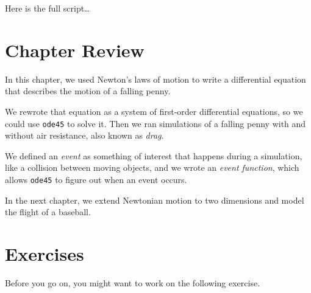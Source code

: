 Here is the full script\dots


\section{Chapter Review}

In this chapter, we used Newton's laws of motion to write a differential equation that describes the motion of a falling penny.

We rewrote that equation as a system of first-order differential equations, so we could use \lstinline{ode45} to solve it.  Then we ran simulations of a falling penny with and without air resistance, also known as \emph{drag}.

We defined an \emph{event} as something of interest that happens during a simulation, like a collision between moving objects, and we wrote an \emph{event function}, which allows \lstinline{ode45} to figure out when an event occurs.

In the next chapter, we extend Newtonian motion to two dimensions and model the flight of a baseball.


\section{Exercises}

Before you go on, you might want to work on the following exercise.

